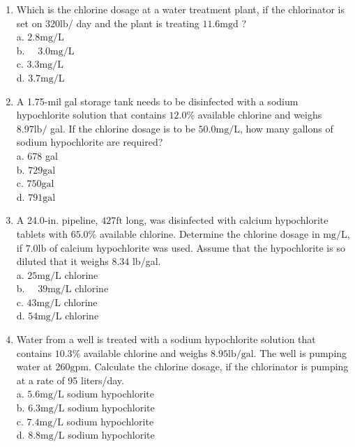 \documentclass[10pt]{article}
\begin{document}
\begin{enumerate}
  \item Which is the chlorine dosage at a water treatment plant, if the chlorinator is set on $320 \mathrm{lb} /$ day and the plant is treating $11.6 \mathrm{mgd}$ ?\\
a. $2.8 \mathrm{mg} / \mathrm{L}$\\
b. $\quad 3.0 \mathrm{mg} / \mathrm{L}$\\
c. $3.3 \mathrm{mg} / \mathrm{L}$\\
d. $3.7 \mathrm{mg} / \mathrm{L}$

  \item A 1.75-mil gal storage tank needs to be disinfected with a sodium hypochlorite solution that contains $12.0 \%$ available chlorine and weighs $8.97 \mathrm{lb} /$ gal. If the chlorine dosage is to be $50.0 \mathrm{mg} / \mathrm{L}$, how many gallons of sodium hypochlorite are required?\\
a. 678 gal\\
b. $729 \mathrm{gal}$\\
c. $750 \mathrm{gal}$\\
d. $791 \mathrm{gal}$

  \item A 24.0-in. pipeline, $427 \mathrm{ft}$ long, was disinfected with calcium hypochlorite tablets with $65.0 \%$ available chlorine. Determine the chlorine dosage in $\mathrm{mg} / \mathrm{L}$, if $7.0 \mathrm{lb}$ of calcium hypochlorite was used. Assume that the hypochlorite is so diluted that it weighs $8.34$ lb/gal.\\
a. $25 \mathrm{mg} / \mathrm{L}$ chlorine\\
b. $\quad 39 \mathrm{mg} / \mathrm{L}$ chlorine\\
c. $43 \mathrm{mg} / \mathrm{L}$ chlorine\\
d. $54 \mathrm{mg} / \mathrm{L}$ chlorine 

  \item Water from a well is treated with a sodium hypochlorite solution that contains $10.3 \%$ available chlorine and weighs $8.95 \mathrm{lb} / \mathrm{gal}$. The well is pumping water at $260 \mathrm{gpm}$. Calculate the chlorine dosage, if the chlorinator is pumping at a rate of 95 liters/day.\\
a. $5.6 \mathrm{mg} / \mathrm{L}$ sodium hypochlorite\\
b. $6.3 \mathrm{mg} / \mathrm{L}$ sodium hypochlorite\\
c. $7.4 \mathrm{mg} / \mathrm{L}$ sodium hypochlorite\\
d. $8.8 \mathrm{mg} / \mathrm{L}$ sodium hypochlorite


\end{enumerate}
\end{document}
